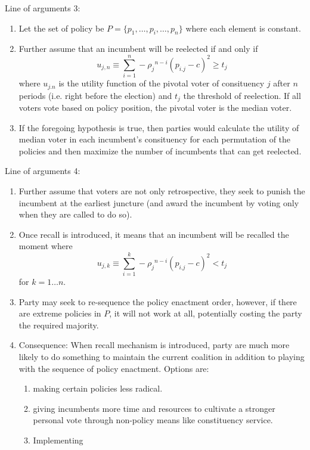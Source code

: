 \documentclass[hyphens, crop=false]{standalone}
\begin{document}
\newpage
	Line of arguments 3:
	\begin{enumerate}
		\item 
		Let the set of policy be $P = \{p_1, \dots, p_i, \dots, p_n\}$ where each element is constant.
		\item 
		Further assume that an incumbent will be reelected if and only if 
		$$
		u_{j, n} \equiv \sum_{i = 1}^{n} -{\rho_j}^{n-i}( p_{i.j}-c)^2 \geq t_j 
		$$
		where $u_{j.n}$ is the utility function of the pivotal voter of consituency $j$ after $n$ periods (i.e. right before the election) and $t_j$ the threshold of reelection. If all voters vote based on policy position, the pivotal voter is the median voter.
		\item 
		If the foregoing hypothesis is true,
		then parties would
		calculate the utility of median voter in each incumbent's consituency
		for each permutation of the policies and then
		maximize the number of incumbents that can get reelected.
	\end{enumerate}
	Line of arguments 4:
	\begin{enumerate}
		\item 
		Further assume that
		voters are not only retrospective,
		they seek to punish the incumbent at the earliest juncture
		(and award the incumbent by voting only when they are called to do so).
		\item 
		Once recall is introduced, it means that an incumbent will be recalled the moment where
		$$
		u_{j, k} \equiv \sum_{i = 1}^{k} -{\rho_j}^{n-i}( p_{i.j}-c)^2 < t_j 
		$$
		for $k = 1\dots n$.
		\item 
		Party may seek to re-sequence the policy enactment order,
		however, if there are extreme policies in $P$, it will not work at all,
		potentially costing the party the required majority.
		\item 
		Consequence: 
		When recall mechanism is introduced,
		party are much more likely to do something to maintain the current coalition in addition to playing with the sequence of policy enactment.
		Options are: 
		\begin{enumerate}
			\item 
			making certain policies less radical.
			\item 
			giving incumbents more time and resources to cultivate a stronger personal vote through non-policy means like constituency service.
			\item 
			Implementing 
		\end{enumerate}
	\end{enumerate}
\end{document}
